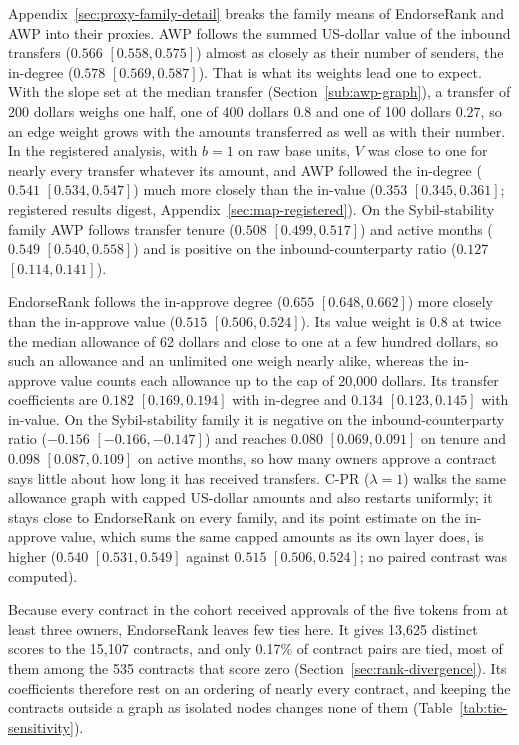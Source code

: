 Appendix~\ref{sec:proxy-family-detail} breaks the family means of EndorseRank and AWP into their proxies. AWP follows the summed US-dollar value of the inbound transfers ($0.566$ $[0.558,0.575]$) almost as closely as their number of senders, the in-degree ($0.578$ $[0.569,0.587]$). That is what its weights lead one to expect. With the slope set at the median transfer (Section~\ref{sub:awp-graph}), a transfer of 200 dollars weighs one half, one of 400 dollars $0.8$ and one of 100 dollars $0.27$, so an edge weight grows with the amounts transferred as well as with their number. In the registered analysis, with $b=1$ on raw base units, $V$ was close to one for nearly every transfer whatever its amount, and AWP followed the in-degree ($0.541$ $[0.534,0.547]$) much more closely than the in-value ($0.353$ $[0.345,0.361]$; registered results digest, Appendix~\ref{sec:map-registered}). On the Sybil-stability family AWP follows transfer tenure ($0.508$ $[0.499,0.517]$) and active months ($0.549$ $[0.540,0.558]$) and is positive on the inbound-counterparty ratio ($0.127$ $[0.114,0.141]$).

EndorseRank follows the in-approve degree ($0.655$ $[0.648,0.662]$) more closely than the in-approve value ($0.515$ $[0.506,0.524]$). Its value weight is $0.8$ at twice the median allowance of 62 dollars and close to one at a few hundred dollars, so such an allowance and an unlimited one weigh nearly alike, whereas the in-approve value counts each allowance up to the cap of 20,000 dollars. Its transfer coefficients are $0.182$ $[0.169,0.194]$ with in-degree and $0.134$ $[0.123,0.145]$ with in-value. On the Sybil-stability family it is negative on the inbound-counterparty ratio ($-0.156$ $[-0.166,-0.147]$) and reaches $0.080$ $[0.069,0.091]$ on tenure and $0.098$ $[0.087,0.109]$ on active months, so how many owners approve a contract says little about how long it has received transfers. C-PR ($\lambda=1$) walks the same allowance graph with capped US-dollar amounts and also restarts uniformly; it stays close to EndorseRank on every family, and its point estimate on the in-approve value, which sums the same capped amounts as its own layer does, is higher ($0.540$ $[0.531,0.549]$ against $0.515$ $[0.506,0.524]$; no paired contrast was computed).

Because every contract in the cohort received approvals of the five tokens from at least three owners, EndorseRank leaves few ties here. It gives 13,625 distinct scores to the 15,107 contracts, and only 0.17\% of contract pairs are tied, most of them among the 535 contracts that score zero (Section~\ref{sec:rank-divergence}). Its coefficients therefore rest on an ordering of nearly every contract, and keeping the contracts outside a graph as isolated nodes changes none of them (Table~\ref{tab:tie-sensitivity}).

